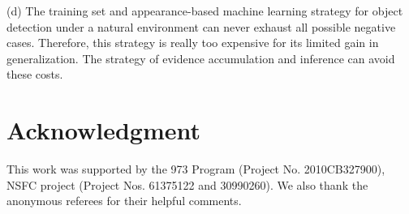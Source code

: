 \documentclass[journal]{IEEEtran}
\begin{document}
(d) The training set and appearance-based machine learning strategy for object detection under a natural environment can never exhaust all possible negative cases. Therefore, this strategy is really too expensive for its limited gain in generalization. The strategy of evidence accumulation and inference can avoid these costs.



\section*{Acknowledgment}

This work was supported by the 973 Program (Project No. 2010CB327900), NSFC project (Project Nos. 61375122 and 30990260). We also thank the anonymous referees for their helpful comments.


\ifCLASSOPTIONcaptionsoff
  \newpage
\fi







%
%
%




\end{document}
